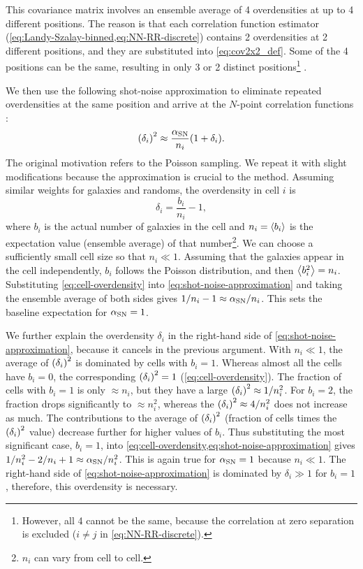 This covariance matrix involves an ensemble average of 4 overdensities at up to 4 different positions.
The reason is that each correlation function estimator (\cref{eq:Landy-Szalay-binned,eq:NN-RR-discrete}) contains 2 overdensities at 2 different positions, and they are substituted into \cref{eq:cov2x2_def}.
Some of the 4 positions can be the same, resulting in only 3 or 2 distinct positions\footnote{However, all 4 cannot be the same, because the correlation at zero separation is excluded ($i\ne j$ in \cref{eq:NN-RR-discrete}).} \citep{rascal}.

We then use the following shot-noise approximation to eliminate repeated overdensities at the same position and arrive at the $N$-point correlation functions \cite{rascal}:
\begin{equation} \label{eq:shot-noise-approximation}
\qty(\delta_i)^2 \approx \frac{\alpha_{\rm SN}}{n_i} \qty(1+\delta_i).
\end{equation}
The original motivation \citep{rascal} refers to the Poisson sampling.
We repeat it with slight modifications because the approximation is crucial to the method.
Assuming similar weights for galaxies and randoms, the overdensity in cell $i$ is
\begin{equation} \label{eq:cell-overdensity}
    \delta_i = \frac{b_i}{n_i} - 1,
\end{equation}
where $b_i$ is the actual number of galaxies in the cell and $n_i=\ev{b_i}$ is the expectation value (ensemble average) of that number\footnote{$n_i$ can vary from cell to cell.}.
We can choose a sufficiently small cell size so that $n_i\ll 1$.
Assuming that the galaxies appear in the cell independently, $b_i$ follows the Poisson distribution, and then $\ev{b_i^2}=n_i$.
Substituting \cref{eq:cell-overdensity} into \cref{eq:shot-noise-approximation} and taking the ensemble average of both sides gives $1/n_i - 1 \approx \alpha_{\rm SN}/n_i$.
This sets the baseline expectation for $\alpha_{\rm SN}=1$.

We further explain the overdensity $\delta_i$ in the right-hand side of \cref{eq:shot-noise-approximation}, because it cancels in the previous argument.
With $n_i\ll 1$, the average of $\qty(\delta_i)^2$ is dominated by cells with $b_i=1$.
Whereas almost all the cells have $b_i=0$, the corresponding $\qty(\delta_i)^2=1$ (\cref{eq:cell-overdensity}).
The fraction of cells with $b_i=1$ is only $\approx n_i$, but they have a large $\qty(\delta_i)^2 \approx 1/n_i^2$.
For $b_i=2$, the fraction drops significantly to $\approx n_i^2$, whereas the $\qty(\delta_i)^2 \approx 4/n_i^2$ does not increase as much.
The contributions to the average of $\qty(\delta_i)^2$ (fraction of cells times the $\qty(\delta_i)^2$ value) decrease further for higher values of $b_i$.
Thus substituting the most significant case, $b_i=1$, into \cref{eq:cell-overdensity,eq:shot-noise-approximation} gives $1/n_i^2 - 2/n_i + 1 \approx \alpha_{\rm SN}/n_i^2$.
This is again true for $\alpha_{\rm SN}=1$ because $n_i\ll 1$.
The right-hand side of \cref{eq:shot-noise-approximation} is dominated by $\delta_i\gg 1$ for $b_i=1$, therefore, this overdensity is necessary.

